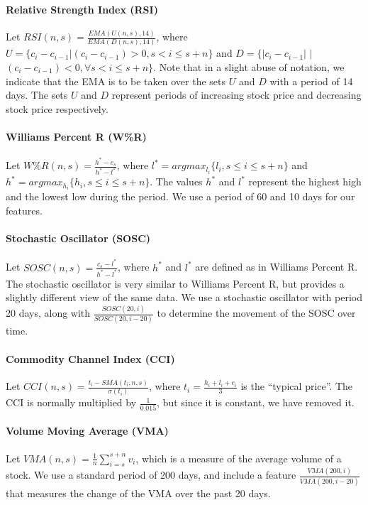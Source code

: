 \documentclass[10pt]{article}
\begin{document}
\paragraph{Relative Strength Index (RSI)} Let $RSI(n, s) = \frac{EMA(U(n,
s), 14)}{EMA(D(n, s), 14)}$, where $U = \{c_i - c_{i-1} | (c_i - c_{i - 1}) >
0, s < i \leq s + n\}$ and $D = \{|c_i - c_{i-1}|$ $|$ $(c_i - c_{i - 1}) < 0,
\forall s < i \leq s + n\}.$ Note that in a slight abuse of notation, we
indicate that the EMA is to be taken over the sets $U$ and $D$ with a period of
14 days. The sets $U$ and $D$ represent periods of increasing stock price and
decreasing stock price respectively.
\vspace{-0.35cm}

\paragraph{Williams Percent R (W\%R)} Let $W\%R(n, s) = \frac{h^* - c_s}{h^* -
l^*}$, where $l^* = argmax_{l_i}\{l_i, s \leq i \leq s + n\}$ and $h^* =
argmax_{h_i}\{h_i, s \leq i \leq s + n\}$. The values $h^*$ and $l^*$ represent
the highest high and the lowest low during the period. We use a period of 60
and 10 days for our features.
\vspace{-0.35cm}

\paragraph{Stochastic Oscillator (SOSC)} Let $SOSC(n, s) = \frac{c_s - l^*}{h^*
- l^*}$, where $h^*$ and $l^*$ are defined as in Williams Percent R. The
stochastic oscillator is very similar to Williams Percent R, but provides a
slightly different view of the same data. We use a stochastic oscillator with
period 20 days, along with $\frac{SOSC(20, i)}{SOSC(20, i - 20)}$ to determine
the movement of the SOSC over time.
\vspace{-0.35cm}

\paragraph{Commodity Channel Index (CCI)} Let $CCI(n, s) = \frac{t_i -
SMA(t_i, n, s)}{\sigma(t_i)}$, where $t_i = \frac{h_i + l_i + c_i}{3}$ is the
``typical price''. The CCI is normally multiplied by $\frac{1}{0.015}$, but since it is constant, we have removed it.
\vspace{-0.35cm}

\paragraph{Volume Moving Average (VMA)} Let $VMA(n, s) =
\frac{1}{n}\sum_{i=s}^{s + n} v_i$, which is a measure of the average volume of
a stock. We use a standard period of 200 days, and include a feature
$\frac{VMA(200, i)}{VMA(200, i - 20)}$ that measures the change of the VMA over
the past 20 days.
\end{document}
